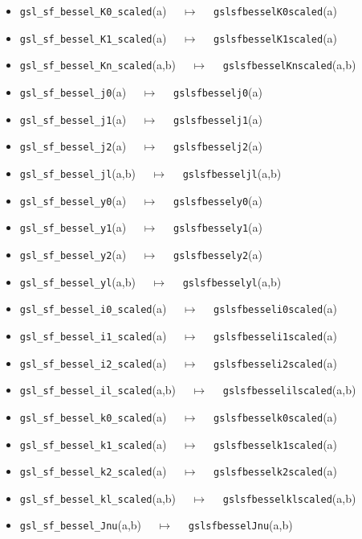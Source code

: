 \documentclass[a4paper,twoside,12pt]{book}
\begin{document}
{\begin{itemize}
\item \texttt{gsl\_sf\_bessel\_K0\_scaled}(a) $\quad \mapsto\quad $ \texttt{gslsfbesselK0scaled}(a) 
\item \texttt{gsl\_sf\_bessel\_K1\_scaled}(a) $\quad \mapsto\quad $ \texttt{gslsfbesselK1scaled}(a) 
\item \texttt{gsl\_sf\_bessel\_Kn\_scaled}(a,b) $\quad \mapsto\quad $ \texttt{gslsfbesselKnscaled}(a,b) 
\item \texttt{gsl\_sf\_bessel\_j0}(a) $\quad \mapsto\quad $ \texttt{gslsfbesselj0}(a) 
\item \texttt{gsl\_sf\_bessel\_j1}(a) $\quad \mapsto\quad $ \texttt{gslsfbesselj1}(a) 
\item \texttt{gsl\_sf\_bessel\_j2}(a) $\quad \mapsto\quad $ \texttt{gslsfbesselj2}(a) 
\item \texttt{gsl\_sf\_bessel\_jl}(a,b) $\quad \mapsto\quad $ \texttt{gslsfbesseljl}(a,b) 
\item \texttt{gsl\_sf\_bessel\_y0}(a) $\quad \mapsto\quad $ \texttt{gslsfbessely0}(a) 
\item \texttt{gsl\_sf\_bessel\_y1}(a) $\quad \mapsto\quad $ \texttt{gslsfbessely1}(a) 
\item \texttt{gsl\_sf\_bessel\_y2}(a) $\quad \mapsto\quad $ \texttt{gslsfbessely2}(a) 
\item \texttt{gsl\_sf\_bessel\_yl}(a,b) $\quad \mapsto\quad $ \texttt{gslsfbesselyl}(a,b) 
\item \texttt{gsl\_sf\_bessel\_i0\_scaled}(a) $\quad \mapsto\quad $ \texttt{gslsfbesseli0scaled}(a) 
\item \texttt{gsl\_sf\_bessel\_i1\_scaled}(a) $\quad \mapsto\quad $ \texttt{gslsfbesseli1scaled}(a) 
\item \texttt{gsl\_sf\_bessel\_i2\_scaled}(a) $\quad \mapsto\quad $ \texttt{gslsfbesseli2scaled}(a) 
\item \texttt{gsl\_sf\_bessel\_il\_scaled}(a,b) $\quad \mapsto\quad $ \texttt{gslsfbesselilscaled}(a,b) 
\item \texttt{gsl\_sf\_bessel\_k0\_scaled}(a) $\quad \mapsto\quad $ \texttt{gslsfbesselk0scaled}(a) 
\item \texttt{gsl\_sf\_bessel\_k1\_scaled}(a) $\quad \mapsto\quad $ \texttt{gslsfbesselk1scaled}(a) 
\item \texttt{gsl\_sf\_bessel\_k2\_scaled}(a) $\quad \mapsto\quad $ \texttt{gslsfbesselk2scaled}(a) 
\item \texttt{gsl\_sf\_bessel\_kl\_scaled}(a,b) $\quad \mapsto\quad $ \texttt{gslsfbesselklscaled}(a,b) 
\item \texttt{gsl\_sf\_bessel\_Jnu}(a,b) $\quad \mapsto\quad $ \texttt{gslsfbesselJnu}(a,b) 

\end{itemize}}
\end{document}
